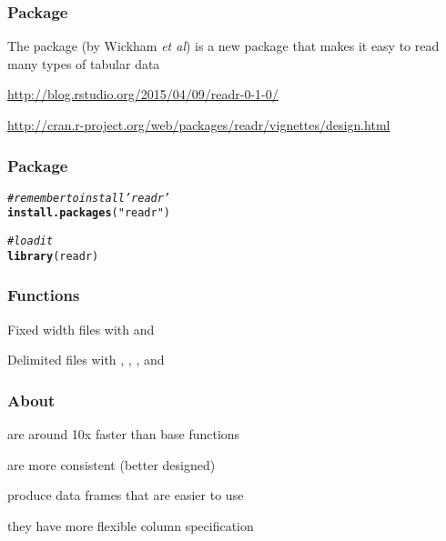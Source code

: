 \documentclass[12pt]{beamer}\usepackage[]{graphicx}\usepackage[]{color}
\makeatletter
\newcommand{\hlstr}[1]{\textcolor[rgb]{0.192,0.494,0.8}{#1}}%
\newcommand{\hlcom}[1]{\textcolor[rgb]{0.678,0.584,0.686}{\textit{#1}}}%
\newcommand{\hlstd}[1]{\textcolor[rgb]{0.345,0.345,0.345}{#1}}%
\newcommand{\hlkwd}[1]{\textcolor[rgb]{0.737,0.353,0.396}{\textbf{#1}}}%
\newenvironment{kframe}{%
 \def\at@end@of@kframe{}%
 \ifinner\ifhmode%
  \def\at@end@of@kframe{\end{minipage}}%
  \begin{minipage}{\columnwidth}%
 \fi\fi%
 \def\FrameCommand##1{\hskip\@totalleftmargin \hskip-\fboxsep
 \colorbox{shadecolor}{##1}\hskip-\fboxsep
     \hskip-\linewidth \hskip-\@totalleftmargin \hskip\columnwidth}%
 \MakeFramed {\advance\hsize-\width
   \@totalleftmargin\z@ \linewidth\hsize
   \@setminipage}}%
 {\par\unskip\endMakeFramed%
 \at@end@of@kframe}
\newenvironment{knitrout}{}{} %
\makeatother
\begin{document}
\begin{frame}
\frametitle{Package }

The package  (by Wickham \textit{et al}) is a new package that makes it easy to read many types of tabular data

\bigskip

{\scriptsize
\url{http://blog.rstudio.org/2015/04/09/readr-0-1-0/}

\url{http://cran.r-project.org/web/packages/readr/vignettes/design.html}
}
\end{frame}


\begin{frame}[fragile]
\frametitle{Package }
\begin{knitrout}\footnotesize
{}\color{fgcolor}\begin{kframe}
\begin{alltt}
\hlcom{# remember to install 'readr'}
\hlkwd{install.packages}\hlstd{(}\hlstr{"readr"}\hlstd{)}

\hlcom{# load it}
\hlkwd{library}\hlstd{(readr)}
\end{alltt}
\end{kframe}
\end{knitrout}
\end{frame}


\begin{frame}
\frametitle{ Functions}

\bi
  \item Fixed width files with  and 
  \item Delimited files with , , , and 
\ei

\end{frame}


\begin{frame}
\frametitle{About }

\bbi
  \item are around 10x faster than base functions
  \item are more consistent (better designed)
  \item produce data frames that are easier to use
  \item they have more flexible column specification
\ei
\eb

\end{frame}
\end{document}
